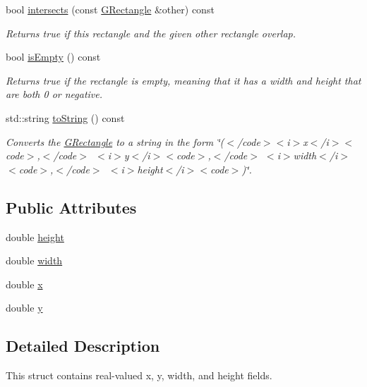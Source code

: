 \begin{DoxyCompactItemize}
bool \mbox{\hyperlink{structGRectangle_aea079d10c5a74c6e7c83b44a44357b42}{intersects}} (const \mbox{\hyperlink{structGRectangle}{G\+Rectangle}} \&other) const
\begin{DoxyCompactList}\small\item\em Returns true if this rectangle and the given other rectangle overlap. \end{DoxyCompactList}\item 
bool \mbox{\hyperlink{structGRectangle_acf82f9b2937375c7b1cf3dccb3df3312}{is\+Empty}} () const
\begin{DoxyCompactList}\small\item\em Returns {\ttfamily true} if the rectangle is empty, meaning that it has a width and height that are both 0 or negative. \end{DoxyCompactList}\item 
std\+::string \mbox{\hyperlink{structGRectangle_a1fe5121d6528fdea3f243321b3fa3a49}{to\+String}} () const
\begin{DoxyCompactList}\small\item\em Converts the {\ttfamily \mbox{\hyperlink{structGRectangle}{G\+Rectangle}}} to a string in the form {\ttfamily \char`\"{}($<$/code$>$$<$i$>$x$<$/i$>$$<$code$>$,$<$/code$>$~$<$i$>$y$<$/i$>$$<$code$>$,$<$/code$>$
$<$i$>$width$<$/i$>$$<$code$>$,$<$/code$>$~$<$i$>$height$<$/i$>$$<$code$>$)\char`\"{}}. \end{DoxyCompactList}\end{DoxyCompactItemize}
\subsection*{Public Attributes}
\begin{DoxyCompactItemize}
\item 
double \mbox{\hyperlink{structGRectangle_a89f6abd564014faeff7cd20c340a9c7d}{height}}
\item 
double \mbox{\hyperlink{structGRectangle_a9df23e056f5d1a0388cd8190431c0e03}{width}}
\item 
double \mbox{\hyperlink{structGRectangle_af88b946fb90d5f08b5fb740c70e98c10}{x}}
\item 
double \mbox{\hyperlink{structGRectangle_ab927965981178aa1fba979a37168db2a}{y}}
\end{DoxyCompactItemize}


\subsection{Detailed Description}
This struct contains real-\/valued x, y, width, and height fields. 

